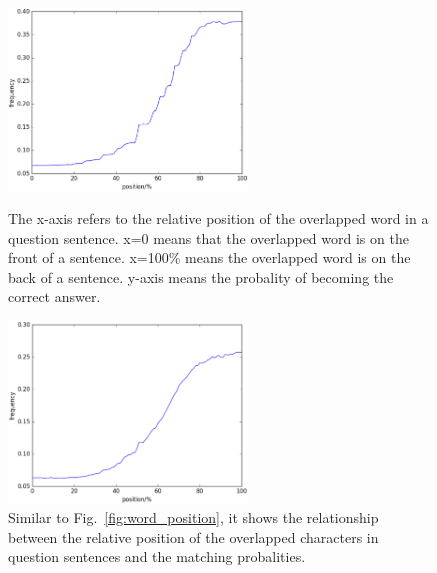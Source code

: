 \documentclass{llncs}
\begin{document}
\begin{figure}[htb]
	\begin{minipage}[t]{0.5\linewidth} 
	\subfigure

		\includegraphics[width=2.5in]{figures/word_position.eps}
		\caption{The x-axis refers to the relative position of the overlapped word in a question sentence. x=0 means that the overlapped word is on the front of  a sentence. x=100\% means the overlapped word is on the back of a sentence. y-axis means the probality of becoming the correct answer.}
		\label{fig:word_position}
	\end{minipage}
	\hspace{1ex}  
	\begin{minipage}[t]{0.5\linewidth} 
	\subfigure
	\centering
		\includegraphics[width=2.5in]{figures/character_position.eps}
		\caption{Similar to Fig.~\ref{fig:word_position}, it shows the relationship between the relative position of the overlapped characters in question sentences and the matching probalities.}
		\label{fig:character_position}
	\end{minipage} 
\end{figure}
\end{document}
